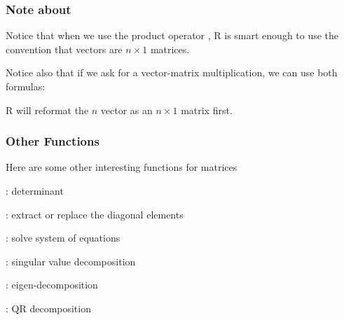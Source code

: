 \documentclass[12pt]{beamer}\usepackage[]{graphicx}\usepackage[]{color}
\begin{document}

\begin{frame}[fragile]
\frametitle{Note about \code{\%*\%}}

Notice that when we use the product operator \code{\%*\%}, R is smart enough to use 
the convention that vectors are $n \times 1$ matrices.

Notice also that if we ask for a vector-matrix multiplication, we can use both
formulas:

\bi
  \item {}
  \item {}
\ei

R will reformat the $n$ vector as an $n \times 1$ matrix first.

\end{frame}


\begin{frame}
\frametitle{Other Functions}

Here are some other interesting functions for matrices

\bi
  \item {\mdlit {}}: determinant
  \item {\mdlit {}}: extract or replace the diagonal elements
  \item {\mdlit {}}: solve system of equations
  \item {\mdlit {}}: singular value decomposition
  \item {\mdlit {}}: eigen-decomposition
  \item {\mdlit {}}: QR decomposition
\ei

\end{frame}

\end{document}
